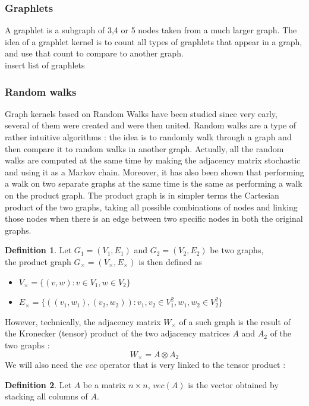 \documentclass{article}
\theoremstyle{definition}
\newtheorem{definition}{Definition}
\begin{document}
\subsubsection{Graphlets}
A graphlet\cite{shervashidze_efficient_2009} is a subgraph of 3,4 or 5 nodes taken from a much larger graph. The idea of a graphlet kernel is to count all types of graphlets that appear in a graph, and use that count to compare to another graph.\\
insert list of graphlets
\subsubsection{Random walks}
Graph kernels based on Random Walks have been studied since very early\cite{kashima_graphkers_2003}, several of them were created and were then united\cite{vishwanathan_graph_2010}. Random walks are a type of rather intuitive algorithms : the idea is to randomly walk through a graph and then compare it to random walks in another graph. Actually, all the random walks are computed at the same time by making the adjacency matrix stochastic and using it as a Markov chain. Moreover, it has also been shown\cite{imrich_prodgraphs} that performing a walk on two separate graphs at the same time is the same as performing a walk on the product graph. The product graph is in simpler terms the Cartesian product of the two graphs, taking all possible combinations of nodes and linking those nodes when there is an edge between two specific nodes in both the original graphs. \\
\begin{definition}
	Let $G_1=(V_{1},E_{1})$ and $G_2=(V_{2},E_{2})$ be two graphs,\\the product graph
	$G_\times = (V_{\times},E_{\times})$ is then defined as
	\begin{itemize}
		\item $V_{\times} = \{(v,w) : v \in V_{1}, w \in V_{2} \}$
		\item $E_{\times} = \{((v_1,w_1),(v_2,w_2)) : v_1,v_2 \in V_{1}^2, w_1,w_2 \in V_{2}^2 \}$
	\end{itemize}
\end{definition}
However, technically, the adjacency matrix $W_{\times}$ of a such graph is the result of the Kronecker (tensor) product of the two adjacency matrices $A$ and $A_2$ of the two graphs \cite{imrich_prodgraphs,noauthor_kronecker_2019}:
\begin{equation}
    W_{\times}=A \otimes A_{2}
\end{equation}
We will also need the $vec$ operator that is very linked to the tensor product :
\begin{definition}
	Let $A$ be a matrix $n\times n$, $vec(A)$ is the vector obtained by stacking all columns of $A$.
\end{definition}
\end{document}
